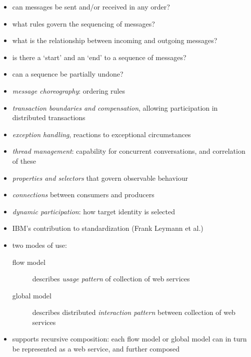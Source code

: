 \documentclass{sepslide-soa-faked} %
\begin{document}
\begin{slide}
\begin{itemize}
\item can messages be sent and/or received in any order?
\item what rules govern the sequencing of messages?
\item what is the relationship between incoming and outgoing messages?
\item is there a `start' and an `end' to a sequence of messages?
\item can a sequence be partially undone?
\end{itemize}
\end{slide}

\begin{slide}
\begin{itemize}
\item \emph{message choreography}: ordering rules
\item \emph{transaction boundaries and compensation}, allowing
participation in distributed transactions
\item \emph{exception handling}, reactions to exceptional circumstances
\item \emph{thread management}: capability for concurrent conversations,
and correlation of these
\item \emph{properties and selectors} that govern observable behaviour
\item \emph{connections} between consumers and producers
\item \emph{dynamic participation}: how target identity is selected
\end{itemize}
\end{slide}

\begin{slide}
\begin{itemize}
\item IBM's contribution to standardization (Frank Leymann et al.)
\item two modes of use:
  \begin{description}
  \item[flow model] describes \emph{usage pattern} of collection of web
    services
  \item[global model] describes distributed \emph{interaction pattern}
    between collection of web services
  \end{description}
\item supports recursive composition: each flow model or global model can
  in turn be represented as a web service, and further composed
\end{itemize}
\end{slide}
\end{document}
